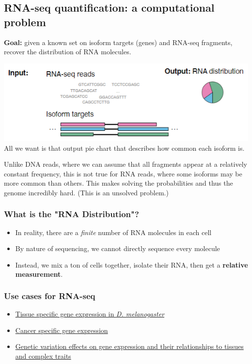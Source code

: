 \documentclass[10pt]{article}
\begin{document}
\subsection*{RNA-seq quantification: a computational problem}
\textbf{Goal:} given a known set on isoform targets (genes) and RNA-seq fragments, recover the distribution of RNA molecules.
\begin{center}
    \includegraphics*[scale=1]{W3_4.png}
    All we want is that output pie chart that describes how common each isoform is.
\end{center}
Unlike DNA reads, where we can assume that all fragments appear at a relatively constant frequency, this is not true for RNA reads, where some isoforms may be more common than others.  This makes solving the probabilities and thus the genome incredibly hard.  (This is an unsolved problem.)

\subsubsection*{What is the "RNA Distribution"?}
\begin{itemize}
    \item In reality, there are a \textit{finite} number of RNA molecules in each cell
    \item By nature of sequencing, we cannot directly sequence every molecule
    \item Instead, we mix a ton of cells together, isolate their RNA, then get a \textbf{relative measurement}.
\end{itemize}

\subsubsection*{Use cases for RNA-seq}
\begin{itemize}
    \item \hyperlink{https://www.nature.com/articles/nature12962}{Tissue specific gene expression in \textit{D. melanogaster}}
    \item \hyperlink{https://link.springer.com/article/10.1186/s12864-017-3906-0}{Cancer specific gene expression}
    \item \hyperlink{https://www.science.org/doi/full/10.1126/science.aaz8528}{Genetic variation effects on gene expression and their relationships to tissues and complex traits}
\end{itemize}   
\end{document}
